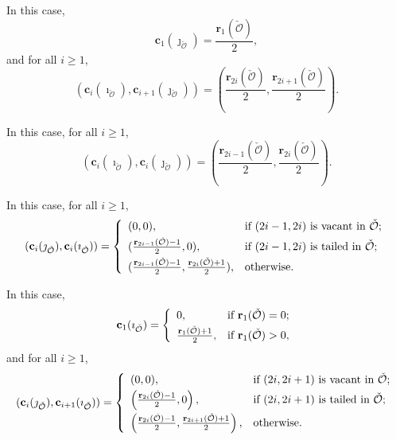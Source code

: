 \documentclass[12pt,a4paper]{amsart}
\newcommand{\CO}{{\mathcal {O}}}
\numberwithin{equation}{section}
\theoremstyle{remark}
\begin{document}
\medskip

 In this case,
\[
  \mathbf c_{1}(\jmath_{\check \CO})=\frac{\mathbf r_1(\check \CO)}{2},
\]
and for all $i\geq 1$,
\[
  \left (\mathbf c_{i}(\imath_{\check \CO}), \mathbf c_{i+1}(\jmath_{\check \CO})\right )= \left (\frac{\mathbf r_{2i}(\check \CO)}{2}, \frac{\mathbf r_{2i+1}(\check \CO)}{2}\right ).
\]

\medskip

 In
this case, for all $i\geq 1$,
\[
  (\mathbf c_{i}(\imath_{\check \CO}), \mathbf c_{i}(\jmath_{\check \CO}))= \left (\frac{\mathbf r_{2i-1}(\check \CO)}{2}, \frac{\mathbf r_{2i}(\check \CO)}{2}\right).
\]

\medskip

 In this case, for all
$i\geq 1$,
\[
  (\mathbf c_{i}(\jmath_{\check \CO}), \mathbf c_{i}(\imath_{\check \CO}))= \left\{
    \begin{array}{ll}
      (0,  0), &\hbox{if $(2i-1, 2i)$ is vacant  in $\check \CO$};\smallskip\\
      (\frac{\mathbf r_{2i-1}(\check \CO)-1}{2},  0), & \hbox{if $(2i-1, 2i)$ is tailed in $\check \CO$};\smallskip\\
      (\frac{\mathbf r_{2i-1}(\check \CO)-1}{2},  \frac{\mathbf r_{2i}(\check \CO)+1}{2}), &\hbox{otherwise}.\\
    \end{array}
  \right.
\]
\medskip

 In this case,
\[
  \mathbf c_{1}(\imath_{\check \CO})= \left\{
    \begin{array}{ll}
      0,  &\hbox{if $\mathbf r_1(\check \CO)=0$}; \smallskip\\
      \frac{\mathbf r_1(\check \CO)+1}{2},   &\hbox{if $\mathbf r_1(\check \CO)>0$},\\
    \end{array}
  \right.
\]
and for all $i\geq 1$,
\[
  (\mathbf c_{i}(\jmath_{\check \CO}), \mathbf c_{i+1}(\imath_{\check \CO}))= \left\{
    \begin{array}{ll}
      (0,  0), &\hbox{if $(2i, 2i+1)$ is vacant in $\check \CO$};\smallskip\\
      \left  (\frac{\mathbf r_{2i}(\check \CO)-1}{2},  0\right ), & \hbox{if $(2i, 2i+1)$ is tailed in $\check \CO$};\smallskip\\
      \left  (\frac{\mathbf r_{2i}(\check \CO)-1}{2},  \frac{\mathbf r_{2i+1}(\check \CO)+1}{2}\right ), &\hbox{otherwise}.\\
    \end{array}
  \right.
\]
\end{document}
